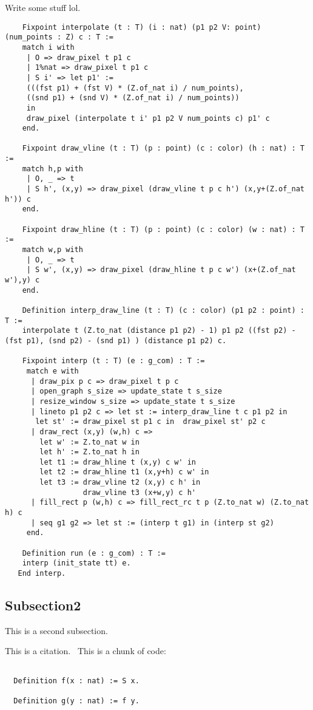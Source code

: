 \documentclass{llncs}
\begin{document}
  Write some stuff lol.
 \begin{lstlisting}
    Fixpoint interpolate (t : T) (i : nat) (p1 p2 V: point) (num_points : Z) c : T :=
    match i with
     | O => draw_pixel t p1 c
     | 1%nat => draw_pixel t p1 c
     | S i' => let p1' :=
     (((fst p1) + (fst V) * (Z.of_nat i) / num_points),
     ((snd p1) + (snd V) * (Z.of_nat i) / num_points))
     in
     draw_pixel (interpolate t i' p1 p2 V num_points c) p1' c 
    end.

    Fixpoint draw_vline (t : T) (p : point) (c : color) (h : nat) : T :=
    match h,p with
     | O, _ => t
     | S h', (x,y) => draw_pixel (draw_vline t p c h') (x,y+(Z.of_nat h')) c
    end.

    Fixpoint draw_hline (t : T) (p : point) (c : color) (w : nat) : T :=
    match w,p with
     | O, _ => t
     | S w', (x,y) => draw_pixel (draw_hline t p c w') (x+(Z.of_nat w'),y) c
    end.

    Definition interp_draw_line (t : T) (c : color) (p1 p2 : point) : T :=
    interpolate t (Z.to_nat (distance p1 p2) - 1) p1 p2 ((fst p2) - (fst p1), (snd p2) - (snd p1) ) (distance p1 p2) c.

    Fixpoint interp (t : T) (e : g_com) : T :=
     match e with
      | draw_pix p c => draw_pixel t p c
      | open_graph s_size => update_state t s_size
      | resize_window s_size => update_state t s_size 
      | lineto p1 p2 c => let st := interp_draw_line t c p1 p2 in 
       let st' := draw_pixel st p1 c in  draw_pixel st' p2 c
      | draw_rect (x,y) (w,h) c =>
        let w' := Z.to_nat w in
        let h' := Z.to_nat h in
        let t1 := draw_hline t (x,y) c w' in
        let t2 := draw_hline t1 (x,y+h) c w' in
        let t3 := draw_vline t2 (x,y) c h' in
                  draw_vline t3 (x+w,y) c h'
      | fill_rect p (w,h) c => fill_rect_rc t p (Z.to_nat w) (Z.to_nat h) c
      | seq g1 g2 => let st := (interp t g1) in (interp st g2)
     end.

    Definition run (e : g_com) : T :=
    interp (init_state tt) e.
   End interp.
 \end{lstlisting}
\subsection{Subsection2} This is a second subsection.

This is a citation.~\cite{gennaro2010non}
This is a chunk of code:

\begin{lstlisting}

  Definition f(x : nat) := S x.

  Definition g(y : nat) := f y.

\end{lstlisting}
\end{document}
